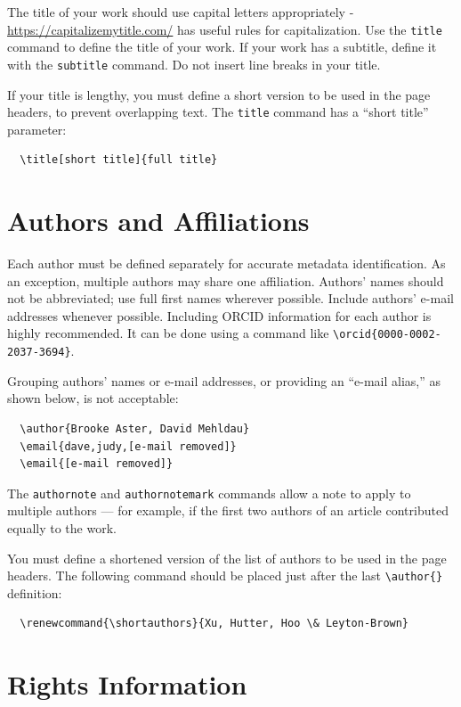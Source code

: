 \documentclass[manuscript, screen, review]{jair}
\begin{document}
The title of your work should use capital letters appropriately -
\url{https://capitalizemytitle.com/} has useful rules for
capitalization. Use the {\verb|title|} command to define the title of
your work. If your work has a subtitle, define it with the
{\verb|subtitle|} command.  Do not insert line breaks in your title.

If your title is lengthy, you must define a short version to be used
in the page headers, to prevent overlapping text. The \verb|title|
command has a ``short title'' parameter:
\begin{verbatim}
  \title[short title]{full title}
\end{verbatim}

\section{Authors and Affiliations}

Each author must be defined separately for accurate metadata
identification.  As an exception, multiple authors may share one
affiliation. Authors' names should not be abbreviated; use full first
names wherever possible. Include authors' e-mail addresses whenever
possible. Including ORCID information for each author is highly recommended. It can be done using a command like \verb|\orcid{0000-0002-2037-3694}|.

Grouping authors' names or e-mail addresses, or providing an ``e-mail
alias,'' as shown below, is not acceptable:
\begin{verbatim}
  \author{Brooke Aster, David Mehldau}
  \email{dave,judy,[e-mail removed]}
  \email{[e-mail removed]}
\end{verbatim}

The \verb|authornote| and \verb|authornotemark| commands allow a note
to apply to multiple authors --- for example, if the first two authors
of an article contributed equally to the work.

You must define a shortened version of
the list of authors to be used in the page headers. The following command should be placed just after
the last \verb|\author{}| definition:
\begin{verbatim}
  \renewcommand{\shortauthors}{Xu, Hutter, Hoo \& Leyton-Brown}
\end{verbatim}

\section{Rights Information}
\end{document}
